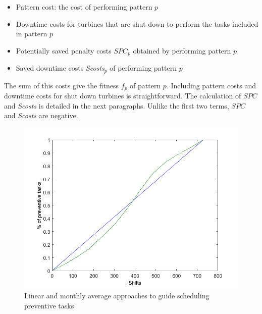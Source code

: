 \begin{itemize}
	\item Pattern cost: the cost of performing pattern $p$
	\item Downtime costs for turbines that are shut down to perform the tasks included in pattern $p$
	\item Potentially saved penalty costs $SPC_p$ obtained by performing pattern $p$%
	\item Saved downtime costs \emph{Scosts}$_p$ of performing pattern $p$ %
\end{itemize}
%
The sum of this costs give the fitness $f_p$ of pattern $p$.
Including pattern costs and downtime costs for shut down turbines is straightforward. The calculation of $S{PC}$ and \emph{Scosts} is detailed in the next paragraphs. Unlike the first two terms, $SPC$ and \emph{Scosts} are negative.
\begin{figure}[hbt]
	\begin{center} 
		\includegraphics[scale=0.6]{EJOR/figures/developactivities.png}
	\end{center}
	\caption{Linear and monthly average approaches to guide scheduling preventive tasks} 
	\label{fig:monthavg} 
\end{figure}
